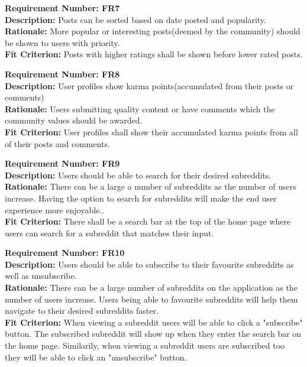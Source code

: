 \documentclass[12pt,fleqn]{article}
\begin{document}
\begin{tcolorbox}
\textbf{Requirement Number: FR7} \\
\textbf{Description:} Posts can be sorted based on date posted and popularity.\\
\textbf{Rationale:} More popular or interesting posts(deemed by the community) should be shown to users with priority. \\
\textbf{Fit Criterion:} Posts with higher ratings shall be shown before lower rated posts.
\end{tcolorbox}

\begin{tcolorbox}
\textbf{Requirement Number: FR8} \\
\textbf{Description:} User profiles show karma points(accumulated from their posts or comments) \\
\textbf{Rationale:} Users submitting quality content or have comments which the community values should be awarded.\\
\textbf{Fit Criterion:} User profiles shall show their accumulated karma points from all of their posts and comments.
\end{tcolorbox}

\begin{tcolorbox}
\textbf{Requirement Number: FR9} \\
\textbf{Description:} Users should be able to search for their desired subreddits. \\
\textbf{Rationale:} There can be a large a number of subreddits as the number of users increase.  Having the option to search for subreddits will make the end user experience more enjoyable..\\
\textbf{Fit Criterion:} There shall be a search bar at the top of the home page where users can search for a subreddit that matches their input.
\end{tcolorbox}

\begin{tcolorbox}
\textbf{Requirement Number: FR10} \\
\textbf{Description:} Users should be able to subscribe to their favourite subreddits as well as unsubscribe.\\
\textbf{Rationale:} There can be a large number of subreddits on the application as the number of users increase. Users being able to favourite subreddits will help them navigate to their desired subreddits faster.\\
\textbf{Fit Criterion:} When viewing a subreddit users will be able to click a "subscribe" button.  The subscribed subreddit will show up when they enter the search bar on the home page.  Similarily, when viewing a subreddit users are subscribed too they will be able to click an "unsubscribe" button.
\end{tcolorbox}
\end{document}
